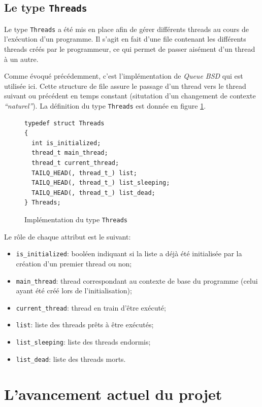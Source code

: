 \documentclass[a4paper,11pt]{article}
\begin{document}
\subsection{Le type \texttt{Threads}}

Le type \texttt{Threads} a été mis en place afin de gérer différents threads au cours de l'exécution d'un programme. Il s'agit en fait d'une file contenant les différents threads créés par le programmeur, ce qui permet de passer aisément d'un thread à un autre.

Comme évoqué précédemment, c'est l'implémentation de \textit{Queue BSD} qui est utilisée ici. Cette structure de file assure le passage d'un thread vers le thread suivant ou précédent en temps constant (situtation d'un changement de contexte \textit{``naturel''}). La définition du type \texttt{Threads} est donnée en figure \ref{threadst}.

\begin{figure}[H]
\begin{lstlisting}
typedef struct Threads
{
  int is_initialized;
  thread_t main_thread;
  thread_t current_thread;
  TAILQ_HEAD(, thread_t_) list;
  TAILQ_HEAD(, thread_t_) list_sleeping;
  TAILQ_HEAD(, thread_t_) list_dead;
} Threads;
\end{lstlisting}
\caption{Implémentation du type \texttt{Threads}}
\label{threadst}
\end{figure}

Le rôle de chaque attribut est le suivant:
\begin{itemize}
  \item \texttt{is\_initialized}: booléen indiquant si la liste a déjà été initialisée par la création d'un premier thread ou non;
  \item \texttt{main\_thread}: thread correspondant au contexte de base du programme (celui ayant été créé lors de l'initialisation);
  \item \texttt{current\_thread}: thread en train d'être exécuté;
  \item \texttt{list}: liste des threads prêts à être exécutés;
  \item \texttt{list\_sleeping}: liste des threads endormis;
  \item \texttt{list\_dead}: liste des threads morts.
\end{itemize}


\section{L'avancement actuel du projet}
\end{document}
